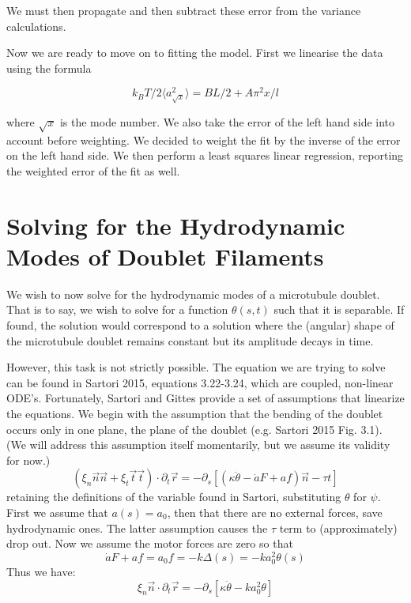 \documentclass{article}
\theoremstyle{exampstyle} \newtheorem*{remark}{Remark}
\newcommand{\1}{\mathds{1}}
\begin{document}
We must then propagate and then subtract these error from the variance calculations. 

Now we are ready to move on to fitting the model. First we linearise the data using the formula

$$ k_B T/2\langle a_{\sqrt x}^2 \rangle=BL/2+A\pi^2x/l $$

where $\sqrt x$ is the mode number. We also take the error of the left hand side into account before weighting. We decided to weight the fit by the inverse of the error on the left hand side. We then perform a least squares linear regression, reporting the weighted error of the fit as well.

\section{Solving for the Hydrodynamic Modes of Doublet Filaments}

We wish to now solve for the hydrodynamic modes of a microtubule doublet. That is to say, we wish to solve for a function $\theta(s,t)$ such that it is separable. If found, the solution would correspond to a solution where the (angular) shape of the microtubule doublet remains constant but its amplitude decays in time.

However, this task is not strictly possible. The equation we are trying to solve can be found in Sartori 2015, equations 3.22-3.24, which are coupled, non-linear ODE's. Fortunately, Sartori and Gittes provide a set of assumptions that linearize the equations. We begin with the assumption that the bending of the doublet occurs only in one plane, the plane of the doublet (e.g. Sartori 2015 Fig. 3.1). (We will address this assumption itself momentarily, but we assume its validity for now.)
$$ (\xi_n \vec{n}\vec{n} + \xi_t \vec{t}\vec{t}) \cdot \partial_t \vec{r} =-\partial_s [(\kappa \ddot{\theta}-\dot{a}F+af)\vec{n}-\tau t] $$
retaining the definitions of the variable found in Sartori, substituting $\theta$ for $\psi$. First we assume that $a(s)=a_0$, then that there are no external forces, save hydrodynamic ones. The latter assumption causes the $\tau$ term to (approximately) drop out. Now we assume the motor forces are zero so that 
$$\dot{a}F+af=a_0f=-k\Delta(s)=-ka_0^2\theta(s) $$
Thus we have:
$$ \xi_n \vec{n} \cdot \partial_t \vec{r} = -\partial_s [\kappa\ddot{\theta} -ka_0^2\theta]$$
\end{document}
